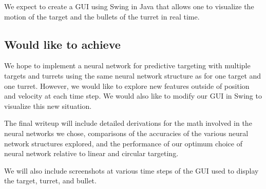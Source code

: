 \documentclass[11pt,letterpaper]{article}
\begin{document}
We expect to create a GUI using Swing in Java that allows one to visualize the motion of the target and the bullets of the turret in real time.

\subsection{Would like to achieve}

We hope to implement a neural network for predictive targeting with multiple targets and turrets using the same neural network structure as for one target and one turret. However, we would like to explore new features outside of position and velocity at each time step. We would also like to modify our GUI in Swing to visualize this new situation.

The final writeup will include detailed derivations for the math involved in the neural networks we chose, comparisons of the accuracies of the various neural network structures explored, and the performance of our optimum choice of neural network relative to linear and circular targeting.

We will also include screenshots at various time steps of the GUI used to display the target, turret, and bullet.



\end{document}
